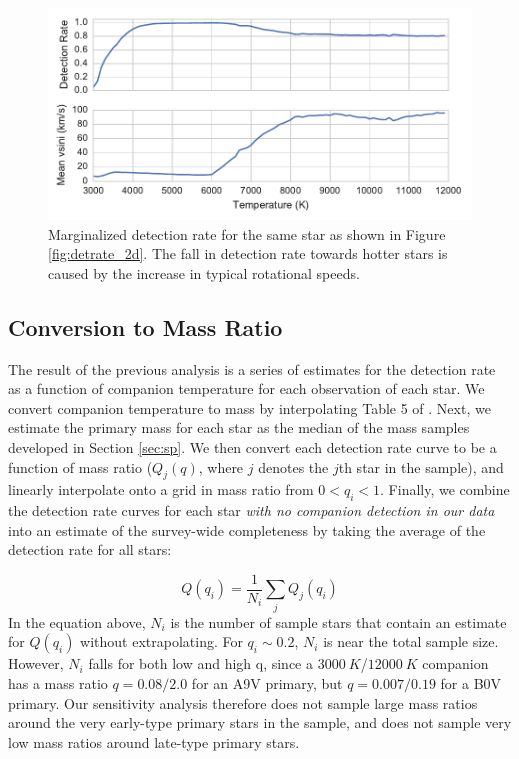 \documentclass{emulateapj}
\begin{document}
\begin{figure}
\includegraphics[width=\columnwidth]{HIP_24244_20130919_marginalized.pdf}
\caption{Marginalized detection rate for the same star as shown in Figure \ref{fig:detrate_2d}. The fall in detection rate towards hotter stars is caused by the increase in typical rotational speeds.}
\label{fig:marginalized}
\end{figure}

\subsection{Conversion to Mass Ratio}

The result of the previous analysis is a series of estimates for the detection rate as a function of companion temperature for each observation of each star. We convert companion temperature to mass by interpolating Table 5 of \citet{Pecaut2013}. Next, we estimate the primary mass for each star as the median of the mass samples developed in Section \ref{sec:sp}. We then convert each detection rate curve to be a function of mass ratio ($Q_j(q)$, where $j$ denotes the $j$th star in the sample), and linearly interpolate onto a grid in mass ratio from $0 < q_i < 1$. Finally, we combine the detection rate curves for each star \emph{with no companion detection in our data} into an estimate of the survey-wide completeness by taking the average of the detection rate for all stars:

\begin{equation}
Q(q_i) = \frac{1}{N_i} \sum_j Q_j(q_i)
\label{eqn:completeness}
\end{equation}
In the equation above, $N_i$ is the number of sample stars that contain an estimate for $Q(q_i)$ without extrapolating. For $q_i \sim 0.2$, $N_i$ is near the total sample size. However, $N_i$ falls for both low and high q, since a $3000\ K$/$12000\ K$ companion has a mass ratio $q = 0.08/2.0$ for an A9V primary, but $q = 0.007/0.19$ for a B0V primary. Our sensitivity analysis therefore does not sample large mass ratios around the very early-type primary stars in the sample, and does not sample very low mass ratios around late-type primary stars.
\end{document}
